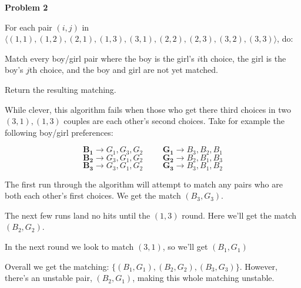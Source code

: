 \documentclass[11pt]{article}
\begin{document}
\renewcommand{\problem}[1]{\item[\textbf{Problem #1}]}

\begin{problems}

  \problem{2}~

  \lineacross 

  \begin{steps}
    \step For each pair $(i,j)$ in $\langle (1,1), (1,2), (2,1), (1, 3), (3, 1), (2,2), (2,3), (3,2), (3,3) \rangle$, do:

    \begin{steps}
      \step Match every boy/girl pair where the boy is the girl's $i$th choice,
      the girl is the boy's $j$th choice, and the boy and girl are not yet matched.
    \end{steps}

    \step Return the resulting matching.
  \end{steps}
  
  \lineacross

  While clever, this algorithm fails when those who get there third choices in two $(3, 1), (1, 3)$ 
  couples are each other's second choices. Take for example the following boy/girl preferences:

  $$\mathbf{B_1} \rightarrow G_1, G_3, G_2 \hspace{1cm} \mathbf{G_1} \rightarrow B_3, B_2, B_1$$
  $$\mathbf{B_2} \rightarrow G_3, G_1, G_2 \hspace{1cm} \mathbf{G_2} \rightarrow B_2, B_1, B_3$$
  $$\mathbf{B_3} \rightarrow G_3, G_1, G_2 \hspace{1cm} \mathbf{G_3} \rightarrow B_3, B_1, B_2$$

  The first run through the algorithm will attempt to match any pairs who are both each other's first choices. We get the match $(B_3,G_3)$.

  The next few runs land no hits until the $(1,3)$ round. Here we'll get the match $(B_2,G_2)$.

  In the next round we look to match $(3, 1)$, so we'll get $(B_1, G_1)$

  Overall we get the matching: $\{(B_1, G_1), (B_2, G_2), (B_3, G_3)\}$. However, there's an unstable pair, $(B_2, G_1)$, making this whole matching unstable.

  \lineacross



\end{problems}
\end{document}
